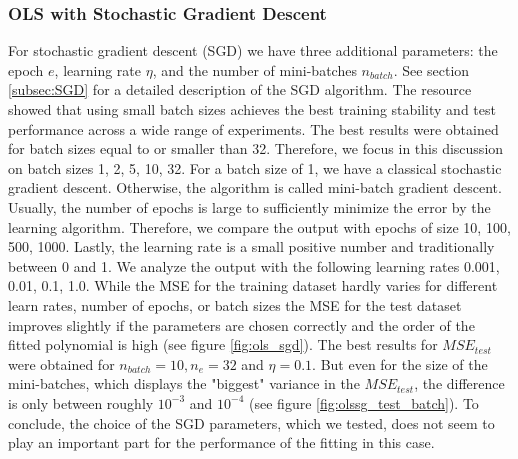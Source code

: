 \subsubsection{OLS with Stochastic Gradient Descent}
For stochastic gradient descent (SGD) we have three additional parameters: the epoch $e$, learning rate $\eta$, and the number of mini-batches $n_{batch}$. See section \ref{subsec:SGD} for a detailed description of the SGD algorithm. The resource  \cite{masters_revisiting_2018} showed that using small batch sizes achieves the best training stability and test performance across a wide range of experiments. The best results were obtained for batch sizes equal to or smaller than 32. Therefore, we focus in this discussion on batch sizes 1, 2, 5, 10, 32. For a batch size of 1, we have a classical stochastic gradient descent. Otherwise, the algorithm is called mini-batch gradient descent. Usually, the number of epochs is large to sufficiently minimize the error by the learning algorithm. Therefore, we compare the output with epochs of size 10, 100, 500, 1000. Lastly, the learning rate is a small positive number and traditionally between 0 and 1. We analyze the output with the following learning rates 0.001, 0.01, 0.1, 1.0. \newline \newline
While the MSE for the training dataset hardly varies for different learn rates, number of epochs, or batch sizes the MSE for the test dataset improves slightly if the parameters are chosen correctly and the order of the fitted polynomial is high (see figure \ref{fig:ols_sgd}). The best results for $MSE_{test}$ were obtained for $n_{batch}=10, n_e=32$ and $\eta=0.1$. But even for the size of the mini-batches, which displays the "biggest" variance in the $MSE_{test}$, the difference is only between roughly $10^{-3}$ and $10^{-4}$ (see figure \ref{fig:olssg_test_batch}). To conclude, the choice of the SGD parameters, which we tested, does not seem to play an important part for the performance of the fitting in this case.

